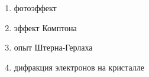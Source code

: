 \begin{enumerate}
    \item фотоэффект
    \item эффект Комптона
    \item опыт Штерна-Герлаха
    \item дифракция электронов на кристалле
\end{enumerate}
